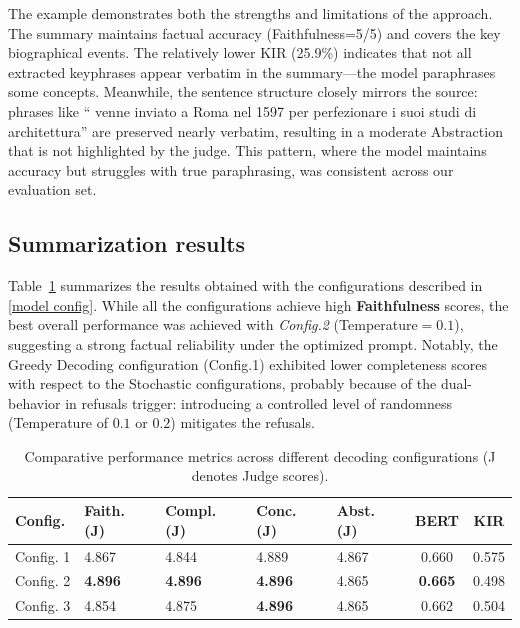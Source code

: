 \documentclass[conference]{IEEEtran}
\begin{document}
The example demonstrates both the strengths and limitations of the approach. The summary maintains factual accuracy (Faithfulness=5/5) and covers the key biographical events. The relatively lower KIR (25.9\%) indicates that not all extracted keyphrases appear verbatim in the summary---the model paraphrases some concepts. Meanwhile, the sentence structure closely mirrors the source: phrases like `` venne inviato a Roma nel 1597 per perfezionare i suoi studi di architettura'' are preserved nearly verbatim, resulting in a moderate Abstraction that is not highlighted by the judge. This pattern, where the model maintains accuracy but struggles with true paraphrasing, was consistent across our evaluation set.

\subsection{Summarization results}
Table~\ref{tab:results_summary} summarizes the results obtained with the configurations described in \ref{model config}. While all the configurations achieve high \textbf{Faithfulness} scores, the best overall performance was achieved with \textit{Config.2} (Temperature$=0.1$), suggesting a strong factual reliability under the optimized prompt. Notably, the Greedy Decoding configuration (Config.1) exhibited lower completeness scores with respect to the Stochastic configurations, probably because of the dual-behavior in refusals trigger: introducing a controlled level of randomness (Temperature of $0.1$ or $0.2$) mitigates the refusals.

\begin{table}[h]
\centering
\small
\begin{tabularx}{\columnwidth}{|l|X|X|X|X|c|c|}
\hline
\textbf{Config.} & \textbf{Faith. (J)} & \textbf{Compl. (J)} & \textbf{Conc. (J)} & \textbf{Abst. (J)} & \textbf{BERT} & \textbf{KIR} \\
\hline
Config. 1 & 4.867 & 4.844 & 4.889 & 4.867 & 0.660 & 0.575 \\
\hline
Config. 2 & \textbf{4.896} & \textbf{4.896} & \textbf{4.896} & 4.865 & \textbf{0.665} & 0.498 \\
\hline
Config. 3 & 4.854 & 4.875 & \textbf{4.896} & 4.865 & 0.662 & 0.504 \\
\hline
\end{tabularx}
\caption{Comparative performance metrics across different decoding configurations (J denotes Judge scores).}
\label{tab:results_summary}
\end{table}
\end{document}

